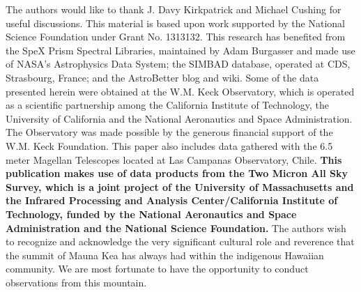 \documentclass[12pt]{aastex6}
\begin{document}
\acknowledgments

The authors would like to thank J. Davy Kirkpatrick and Michael Cushing for useful discussions.
This material is based upon work supported by the National Science Foundation under Grant No. 1313132.
This research has benefited from the SpeX Prism Spectral Libraries, maintained by Adam Burgasser
and made use of NASA's Astrophysics Data System; the SIMBAD database, operated at CDS, Strasbourg, France; and the AstroBetter blog and wiki.
Some of the data presented herein were obtained at the W.M. Keck Observatory, which is operated as a scientific partnership among the California Institute of Technology, the University of California and the National Aeronautics and Space Administration. The Observatory was made possible by the generous financial support of the W.M. Keck Foundation.
This paper also includes data gathered with the 6.5 meter Magellan Telescopes located at Las Campanas Observatory, Chile.
\textbf{This publication makes use of data products from the Two Micron All Sky Survey, which is a joint project of the University of Massachusetts and the Infrared Processing and Analysis Center/California Institute of Technology, funded by the National Aeronautics and Space Administration and the National Science Foundation.}
The authors wish to recognize and acknowledge the very significant cultural role and reverence that the summit of Mauna Kea has always had within the indigenous Hawaiian community.  We are most fortunate to have the opportunity to conduct observations from this mountain.




\end{document}
